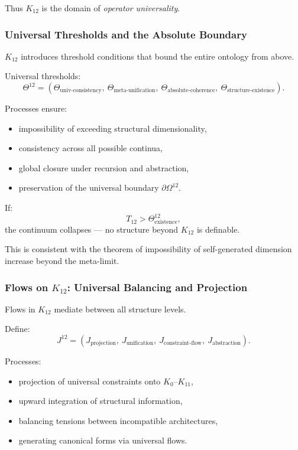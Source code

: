 Thus $K_{12}$ is the domain of \emph{operator universality}.

\subsubsection{Universal Thresholds and the Absolute Boundary}

$K_{12}$ introduces threshold conditions that bound 
the entire ontology from above.

Universal thresholds:
\[
\Theta^{12} = 
(\Theta_{\text{univ-consistency}},\
 \Theta_{\text{meta-unification}},\
 \Theta_{\text{absolute-coherence}},\
 \Theta_{\text{structure-existence}}).
\]

Processes ensure:
\begin{itemize}
    \item impossibility of exceeding structural dimensionality,
    \item consistency across all possible continua,
    \item global closure under recursion and abstraction,
    \item preservation of the universal boundary $\partial\Omega^{12}$.
\end{itemize}

If:
\[
T_{12} > \Theta^{12}_{\text{existence}},
\]
the continuum collapses --- no structure beyond $K_{12}$ is definable.

This is consistent with the theorem of impossibility of 
self-generated dimension increase beyond the meta-limit.

\subsubsection{Flows on $K_{12}$: Universal Balancing and Projection}

Flows in $K_{12}$ mediate between all structure levels.

Define:
\[
J^{12} = 
(J_{\text{projection}},\ J_{\text{unification}},\ 
 J_{\text{constraint-flow}},\ J_{\text{abstraction}}).
\]

Processes:
\begin{itemize}
    \item projection of universal constraints onto $K_0$--$K_{11}$,
    \item upward integration of structural information,
    \item balancing tensions between incompatible architectures,
    \item generating canonical forms via universal flows.
\end{itemize}

